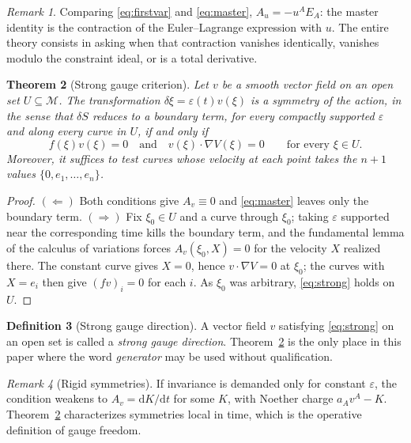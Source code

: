 \documentclass[12pt]{article}
\theoremstyle{plain}
\newtheorem{theorem}{Theorem}[section]
\theoremstyle{definition}
\newtheorem{definition}[theorem]{Definition}
\theoremstyle{remark}
\newtheorem{remark}[theorem]{Remark}
\newcommand{\dd}{\mathrm{d}}
\newcommand{\Mm}{\mathcal{M}}
\begin{document}
	\begin{remark}
		Comparing \eqref{eq:firstvar} and \eqref{eq:master}, $A_{u}=-u^{A}E_{A}$: the
		master identity is the contraction of the Euler--Lagrange expression with $u$.
		The entire theory consists in asking when that contraction vanishes
		identically, vanishes modulo the constraint ideal, or is a total derivative.
	\end{remark}
	
	\begin{theorem}[Strong gauge criterion]
		\label{thm:strong}
		Let $v$ be a smooth vector field on an open set $U\subseteq\Mm$. The
		transformation $\delta\xi=\varepsilon(t)v(\xi)$ is a symmetry of the action, in
		the sense that $\delta S$ reduces to a boundary term, for every compactly
		supported $\varepsilon$ and along every curve in $U$, if and only if
		\begin{equation}
			f(\xi)v(\xi)=0
			\quad\text{and}\quad
			v(\xi)\cdot\nabla V(\xi)=0
			\qquad\text{for every }\xi\in U .
			\label{eq:strong}
		\end{equation}
		Moreover, it suffices to test curves whose velocity at each point takes the
		$n+1$ values $\{0,e_{1},\dots,e_{n}\}$.
	\end{theorem}
	
	\begin{proof}
		$(\Leftarrow)$ Both conditions give $A_{v}\equiv0$ and \eqref{eq:master} leaves
		only the boundary term. $(\Rightarrow)$ Fix $\xi_{0}\in U$ and a curve through
		$\xi_{0}$; taking $\varepsilon$ supported near the corresponding time kills the
		boundary term, and the fundamental lemma of the calculus of variations forces
		$A_{v}(\xi_{0},X)=0$ for the velocity $X$ realized there. The constant curve
		gives $X=0$, hence $v\cdot\nabla V=0$ at $\xi_{0}$; the curves with $X=e_{i}$
		then give $(fv)_{i}=0$ for each $i$. As $\xi_{0}$ was arbitrary,
		\eqref{eq:strong} holds on $U$.
	\end{proof}
	
	\begin{definition}[Strong gauge direction]
		\label{def:strongdir}
		A vector field $v$ satisfying \eqref{eq:strong} on an open set is called a
		\emph{strong gauge direction}. Theorem~\ref{thm:strong} is the only place in
		this paper where the word \emph{generator} may be used without qualification.
	\end{definition}
	
	\begin{remark}[Rigid symmetries]
		If invariance is demanded only for constant $\varepsilon$, the condition weakens
		to $A_{v}=\dd K/\dd t$ for some $K$, with Noether charge $a_{A}v^{A}-K$.
		Theorem~\ref{thm:strong} characterizes symmetries local in time, which is the
		operative definition of gauge freedom.
	\end{remark}
	
\end{document}
